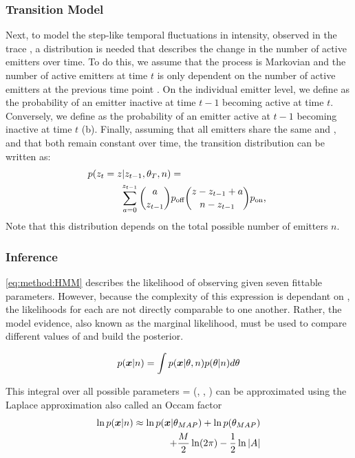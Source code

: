 \subsubsection{Transition Model}
Next, to model the step-like temporal fluctuations in intensity, observed in the trace \trace, 
  a distribution is needed that describes the change in the number of active emitters \z{} over time. 
  To do this, we assume that the process is Markovian and the number of active emitters  
  at time $t$ is only dependent on the number of active emitters at the previous time point .
  On the individual emitter level, we define \pon as the probability of an emitter inactive at time $t-1$ becoming active at time $t$. 
  Conversely,  we define \poff as the probability of an emitter active at $t-1$ becoming inactive at time $t$ (b).
  Finally, assuming that all emitters share the same \pon and \poff, and that both remain constant over time, 
  the transition distribution can be written as:
  \begin{align}
    \label{eq:method:transition}
    p(z_{t} = z | z_{t-1}, \theta_{T}, n) &=\\
    \sum_{a = 0}^{z_{t-1}}
      {a \choose z_{t-1}}
      &\poff
      {z - z_{t-1} + a \choose \n - z_{t-1}}
      \pon
      \text{,} \notag\
  \end{align}
  Note that this distribution depends on the total possible number of emitters $n$.

\subsubsection{Inference}

\eqref{eq:method:HMM} describes the likelihood of observing \trace given seven fittable parameters.
  However, because the complexity of this expression is dependant on \n, the likelihoods for each \n are not directly comparable to one another.
  Rather, the model evidence, also known as the marginal likelihood, must be used to compare different values of \n and build the posterior. 

  \begin{equation*}
    p(\bm{x} | n) = \int p(\bm{x} | \theta, n) p(\theta | n) d\theta
  \end{equation*}

  This integral over all possible parameters \parameters = (\parametersc, \parameterse, \parameterst) can be approximated using the 
  Laplace approximation also called an Occam factor \cite{bishop_pattern_2006}
  \begin{align*}
    \ln p(\bm{x} | n) \approx \ln p(\bm{x} | \theta_{MAP}) + \ln p(\theta_{MAP}) &\\
    + \frac{M}{2} \ln(2\pi) - \frac{1}{2} \ln |A|
    \label{eq:method:evidence_with_m}
  \end{align*}

